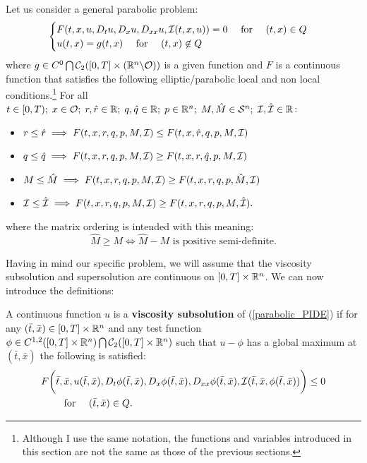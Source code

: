 \noindent
Let us consider a general parabolic problem:
\begin{equation}\label{parabolic_PIDE}
\begin{cases}
F(t,x,u,D_t u,D_x u,D_{xx}u,\mathcal{I}(t,x,u)) = 0 \quad \mbox{ for } \quad (t,x) \in Q \\
u(t,x) = g(t,x) \quad \mbox{ for } \quad (t,x) \not \in Q
\end{cases}
\end{equation}
where $g \in C^0 \bigcap \mathcal{C}_2([0,T] \times (\mathbb{R}^n \backslash \mathcal{O}))$ is a given function and 
$F$ is a continuous function that satisfies the following elliptic/parabolic local and non local conditions.\footnote{Although I use the same notation, 
the functions and variables introduced in this section are not the same as those of the previous sections.} 
For all $t\in [0,T); \; x \in \mathcal{O}; \; r,\hat r \in \mathbb{R}; \; q,\hat q \in \mathbb{R}; \; 
p \in \mathbb{R}^n; \; M,\hat M \in \mathcal{S}^n; \; \mathcal{I}, \hat {\mathcal{I}} \in \mathbb{R}$:
\begin{itemize}
 \item $r \leq \hat r \; \Longrightarrow  \; F(t,x,r,q,p,M,\mathcal{I}) \leq F(t,x,\hat r,q,p,M,\mathcal{I}) $
 \item $q \leq \hat q \; \Longrightarrow  \; F(t,x,r,q,p,M,\mathcal{I}) \geq F(t,x,r,\hat q,p,M,\mathcal{I}) $
 \item $M \leq \hat M \; \Longrightarrow  \; F(t,x,r,q,p,M,\mathcal{I}) \geq F(t,x,r,q,p,\hat M,\mathcal{I}) $
 \item $\mathcal{I} \leq \hat {\mathcal{I}} \; \Longrightarrow  \; F(t,x,r,q,p,M,\mathcal{I}) \geq F(t,x,r,q,p,M,\hat {\mathcal{I}}). $
\end{itemize}
where the matrix ordering is intended with this meaning:
$$ \hat M \geq M \Leftrightarrow \hat M - M \mbox{ is positive semi-definite.} $$

Having in mind our specific problem, we will assume that the viscosity subsolution and supersolution are continuous on $[0,T]\times \mathbb{R}^n$.
We can now introduce the definitions:
\begin{Definition}
 A continuous function $u$ is a \textbf{viscosity subsolution} of (\ref{parabolic_PIDE})
 if for any $(\bar t, \bar x) \in [0,T]\times \mathbb{R}^n$ and any test function $ \phi \in C^{1,2}([0,T] \times \mathbb{R}^n) \bigcap \mathcal{C}_2([0,T] \times \mathbb{R}^n)$ 
 such that $u-\phi$ has a global maximum at $(\bar t,\bar x)$ the following is satisfied:
\begin{align}\label{subsolution}
 & F\biggl( \bar t,\bar x,u(\bar t,\bar x),D_t \phi(\bar t,\bar x), D_x \phi(\bar t,\bar x),D_{xx}\phi(\bar t,\bar x),\mathcal{I}(\bar t, \bar x,\phi(\bar t,\bar x))\biggr) \leq 0 \\ \nonumber
 &  \quad \quad \mbox{ for } \quad (\bar t,\bar x) \in Q.
\end{align}
\end{Definition}

